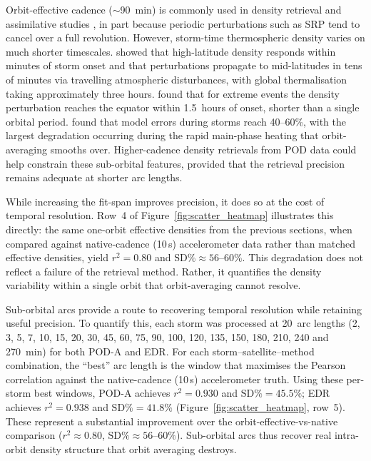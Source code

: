 \documentclass{agujournal2019}
\begin{document}
Orbit-effective cadence ($\sim$90~min) is commonly used in density
retrieval and assimilative studies
\cite{Matsuo2012DataDensity, Sutton2018AThermosphere}, in part because
periodic perturbations such as SRP tend to cancel over a full revolution.
However, storm-time
thermospheric density varies on much shorter timescales.
 showed that high-latitude density
responds within minutes of storm onset and that perturbations propagate to
mid-latitudes in tens of minutes via travelling atmospheric disturbances,
with global thermalisation taking approximately three hours.
 found that for extreme events the
density perturbation reaches the equator within 1.5~hours of onset, shorter
than a single orbital period.  found that model errors during
storms reach 40--60\%, with the largest degradation occurring during
the rapid main-phase heating that orbit-averaging smooths over. Higher-cadence density retrievals from POD
data could help constrain these sub-orbital features, provided that the
retrieval precision remains adequate at shorter arc lengths.

While increasing the fit-span improves precision, it does so at the cost of
temporal resolution. Row~4 of Figure~\ref{fig:scatter_heatmap} illustrates
this directly: the same one-orbit effective densities from the previous
sections, when compared against native-cadence (10\,s) accelerometer data
rather than matched effective densities, yield $r^{2} = 0.80$ and
$\text{SD\%} \approx 56$--$60\%$. This degradation does not reflect a failure of
the retrieval method. Rather, it quantifies the density variability within a
single orbit that orbit-averaging cannot resolve.

Sub-orbital arcs provide a route to recovering temporal resolution while
retaining useful precision. To quantify this, each storm was processed at
20~arc lengths (2, 3, 5, 7, 10, 15, 20, 30, 45, 60, 75, 90, 100, 120,
135, 150, 180, 210, 240 and 270~min) for both POD-A and EDR. For each
storm--satellite--method combination, the ``best'' arc length is the window
that maximises the Pearson correlation against the native-cadence (10\,s)
accelerometer truth. Using these per-storm best windows,
POD-A achieves $r^{2} = 0.930$ and $\text{SD\%} = 45.5\%$; EDR
achieves $r^{2} = 0.938$ and $\text{SD\%} = 41.8\%$
(Figure~\ref{fig:scatter_heatmap}, row~5). These
represent a substantial improvement over the orbit-effective-vs-native
comparison ($r^{2} \approx 0.80$, $\text{SD\%} \approx 56$--$60\%$).
Sub-orbital arcs thus recover real intra-orbit density structure that
orbit averaging destroys.
\end{document}
